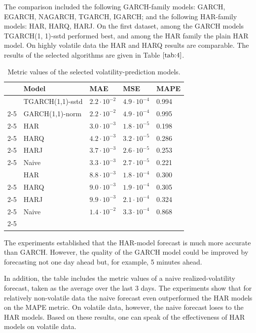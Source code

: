 \documentclass[]{article}
\begin{document}
The comparison included the following GARCH-family models: GARCH, EGARCH, NAGARCH, TGARCH, IGARCH; and the following HAR-family models: HAR, HARQ, HARJ.
On the first dataset, among the GARCH models TGARCH(1, 1)-sstd performed best, and among the HAR family the plain HAR model. On highly volatile data the HAR and HARQ results are comparable. The results of the selected algorithms are given in Table $\ref{tab:4}$.

\begin{table}[h!]
	\centering
	\caption{Metric values of the selected volatility-prediction models.}
	\begin{tabularx}{\textwidth}{|X|X|X|X|l|}
		\hline
								  & Model            &   MAE   & MSE     & MAPE     \\ \hline
		                          & TGARCH(1,1)-sstd & $2.2\cdot10^{-2}$ & $4.9\cdot10^{-4}$  & 0.994    \\ \cline{2-5}
		\centering{Period}        & GARCH(1,1)-norm  & $2.2\cdot10^{-2}$ & $4.9\cdot10^{-4}$  & 0.995    \\ \cline{2-5}
    	\centering{2020-01-03}    & HAR              & $3.0\cdot10^{-3}$ & $1.8\cdot10^{-5}$  & 0.198    \\ \cline{2-5}
    	\centering{to 2024-11-29} & HARQ             & $4.2\cdot10^{-3}$ & $3.2\cdot10^{-5}$  & 0.286    \\ \cline{2-5}
    	                          & HARJ             & $3.7\cdot10^{-3}$ & $2.6\cdot10^{-5}$  & 0.253    \\ \cline{2-5}
    	                          & Naive            & $3.3\cdot10^{-3}$ & $2.7\cdot10^{-5}$  & 0.221    \\ \hline
		\centering{Period}        & HAR              & $8.8\cdot10^{-3}$ & $1.8\cdot10^{-4}$  & 0.300    \\ \cline{2-5}
		\centering{2017-01-01}    & HARQ             & $9.0\cdot10^{-3}$ & $1.9\cdot10^{-4}$  & 0.305    \\ \cline{2-5}
		\centering{to 2020-03-25} & HARJ             & $9.9\cdot10^{-3}$ & $2.1\cdot10^{-4}$  & 0.324    \\ \cline{2-5}
		                   & Naive            & $1.4\cdot10^{-2}$ & $3.3\cdot10^{-4}$  & 0.868    \\ \cline{2-5}
		\hline
	\end{tabularx}
	\label{tab:4}
\end{table}

The experiments established that the HAR-model forecast is much more accurate than GARCH. However, the quality of the GARCH model could be improved by forecasting not one day ahead but, for example, 5 minutes ahead.

In addition, the table includes the metric values of a naive realized-volatility forecast, taken as the average over the last 3 days. The experiments show that for relatively non-volatile data the naive forecast even outperformed the HAR models on the MAPE metric. On volatile data, however, the naive forecast loses to the HAR models. Based on these results, one can speak of the effectiveness of HAR models on volatile data.
\end{document}
